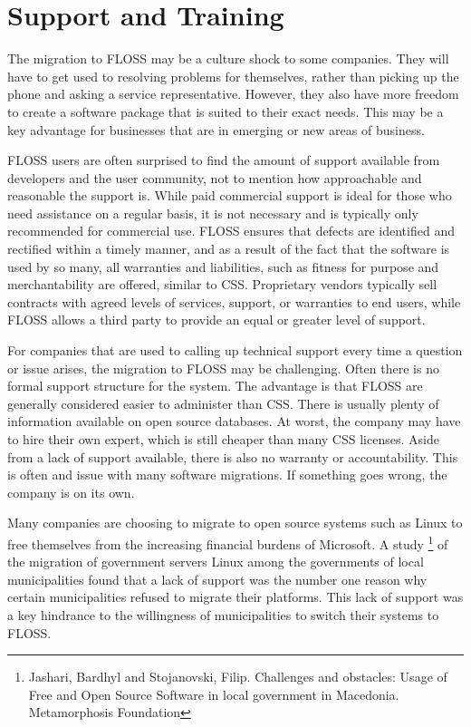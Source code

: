  \section{Support and Training}
 \label{sec:Support}


 The migration to FLOSS may be a culture shock to some companies. They will have to get used to resolving problems for themselves, rather than picking up the phone and asking a service representative. However, they also have more freedom to create a software package that is suited to their exact needs. This may be a key advantage for businesses that are in emerging or new areas of business. 

 FLOSS users are often surprised to find the amount of support available from developers and the user community, not to mention how approachable and reasonable the support is. While paid commercial support is ideal for those who need assistance on a regular basis, it is not necessary and is typically only recommended for commercial use. FLOSS ensures that defects are identified and rectified within a timely manner, and as a result of the fact that the software is used by so many, all warranties and liabilities, such as fitness for purpose and merchantability are offered, similar to CSS.  Proprietary vendors typically sell contracts with agreed levels of services, support, or warranties to end users, while FLOSS allows a third party to provide an equal or greater level of support.




 For companies that are used to calling up technical support every time a question or issue arises, the migration to FLOSS may be challenging. Often there is no formal support structure for the system. The advantage is that FLOSS are generally considered easier to administer than CSS. There is usually plenty of information available on open source databases. At worst, the company may have to hire their own expert, which is still cheaper than many CSS licenses. Aside from a lack of support available, there is also no warranty or accountability. This is often and issue with many software migrations. If something goes wrong, the company is on its own. 

 Many companies are choosing to migrate to open source systems such as Linux to free themselves from the increasing financial burdens of Microsoft. A study \footnote{Jashari, Bardhyl and Stojanovski, Filip. Challenges and obstacles: Usage of Free and Open Source Software in local government in Macedonia. Metamorphosis Foundation\label{ftn:Macedonia}} of the migration of government servers Linux  among the governments of local municipalities found that a lack of support was the number one reason why certain municipalities refused to migrate their platforms. This lack of support was a key hindrance to the willingness of municipalities to switch their systems to FLOSS.


